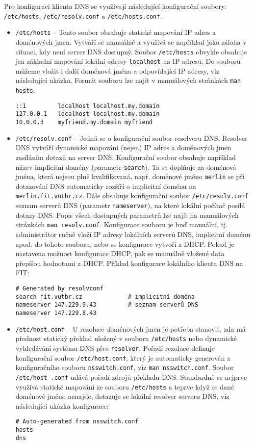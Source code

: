 Pro konfiguraci klienta DNS se využívají následující konfigurační soubory: {\tt /etc/hosts}, {\tt /etc/re\-solv.conf} a {\tt /etc/hosts.conf}. 
\begin{itemize}
  \item {\tt /etc/hosts} -- Tento soubor obsahuje statické mapování IP adres a doménových jmen. Vytváří se manuálně a využívá se například jako záloha v situaci, kdy není server DNS dostupný. Soubor {\tt /etc/hosts} obvykle obsahuje jen základní mapování lokální adresy {\tt localhost} na IP adresu. Do souboru můžeme vložit i další doménová jména a odpovídající IP adresy, viz následující ukázka. Formát souboru lze najít v manuálových stránkách {\tt man hosts}. 
\begin{verbatim}
::1         localhost localhost.my.domain
127.0.0.1   localhost localhost.my.domain
10.0.0.3    myfriend.my.domain myfriend
\end{verbatim}
  \item {\tt /etc/resolv.conf} -- Jedná se o konfigurační soubor resolveru DNS. Resolver DNS vytváří dynamické mapování (nejen) IP adres a doménových jmen zasíláním dotazů na server DNS. Konfigurační soubor obsahuje například název implicitní domény (parametr {\tt search}). Ta se doplňuje za doménová jména, která nejsou plně kvalifikovaná, např. doménové jméno {\tt merlin} se při dotazování DNS automaticky rozšíří o implicitní doménu na {\tt merlin.fit.vutbr.cz}. Dále obsahuje konfigurační soubor {\tt /etc/resolv.conf} seznam serverů DNS (parametr {\tt nameserver}), na které lokální počítač posílá dotazy DNS. Popis všech dostupných parametrů lze najít na manuálových stránkách {\tt man resolv.conf}. Konfigurace souboru je buď manuální, tj. administrátor ručně vloží IP adresy lokálních serverů DNS, implicitní doménu apod. do tohoto souboru, nebo se konfigurace vytvoří z DHCP. Pokud je nastavena možnost konfigurace DHCP, pak se manuálně vložené data přepíšou hodnotami z DHCP. Příklad konfigurace lokálního klienta DNS na FIT:
\begin{verbatim}
# Generated by resolvconf
search fit.vutbr.cz             # implicitní doména
nameserver 147.229.9.43         # seznam serverů DNS
nameserver 147.229.8.43
\end{verbatim}
  \item {\tt /etc/host.conf} -- U rezoluce doménových jmen je potřeba stanovit, zda má přednost statický překlad uložený v souboru {\tt /etc/hosts} nebo dynamické vyhledávání systému DNS přes {\tt resolver}. Pořadí rezoluce definuje konfigurační soubor {\tt /etc/host.conf}, který je automaticky generován z konfiguračního souboru {\tt nsswitch.conf}, viz {\tt man nsswitch.conf}. Soubor {\tt /etc/host .conf} udává pořadí zdrojů překladu DNS. Standardně se nejprve využívá statické mapování ze souboru {\tt /etc/hosts} a teprve když se dané doménové jméno nenajde, dotazuje se lokální resolver serveru DNS, viz následující ukázka konfigurace:
\begin{verbatim}
# Auto-generated from nsswitch.conf
hosts
dns
\end{verbatim}
\end{itemize}


